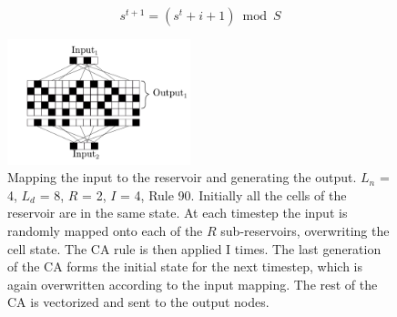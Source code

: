\documentclass{elsarticle}
\begin{document}
\begin{multicols}{2}
	\begin{equation} \label{eq:input}
		s^{t+1} = (s^t + i + 1) \bmod S
	\end{equation}    
	
	
	\begin{figure}[H]
		\centering
		\includegraphics[width=0.475\textwidth]{Architecture.pdf}
		\caption{Mapping the input to the reservoir and generating the output.  
			$L_{n}$ = 4, $L_{d}$ = 8, $R$ = 2, $I$ = 4, Rule 90. Initially all the 
			cells of the reservoir are in the same state. At each timestep the 
			input is randomly mapped onto each of the $R$ sub-reservoirs, 
			overwriting the cell state. The CA rule is then applied I 
			times. The last generation of the CA forms the initial 
			state for the next timestep, which is again overwritten 
			according to the input mapping. The rest of the CA is 
		vectorized and sent to the output nodes. } 
		
		\label{architecture}
	\end{figure}
	

\end{multicols}
\end{document}
